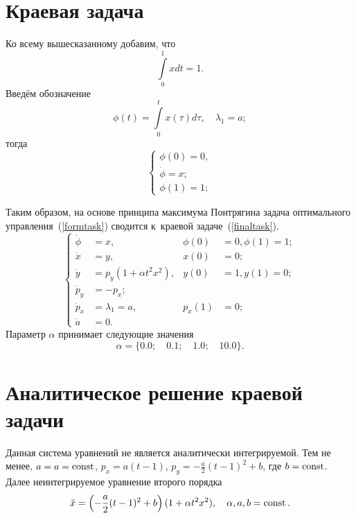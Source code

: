 \section{Краевая задача}
Ко всему вышесказанному добавим, что 
\[
\int\limits_{0}^{1} x dt = 1.
\]
Введём обозначение
\[
\phi(t) = \int\limits_{0}^{t} x(\tau) d\tau, \quad \lambda_1 = a;
\]
тогда 
\begin{equation}\label{dopeqq}
\begin{cases}
\phi(0) = 0,\\ 
\dot\phi = x;\\
\phi(1) = 1;
\end{cases}
\end{equation}

Таким образом, на основе принципа максимума Понтрягина задача оптимального управления~(\ref{formtask}) сводится к~краевой задаче~(\ref{finaltask}). 
\begin{equation}\label{finaltask}\left\{
\begin{aligned}
	\dot\phi &= x,&\phi(0)&=0,\phi(1)=1;\\
	\dot{x} &= y,&x(0)&=0; \\
	\dot{y} &= p_y (1 + \alpha t^2x^2),&y(0)&=1,y(1)=0;\\ %
	\dot{p}_y &= - p_x;\\
	\dot{p}_x &= \lambda_1 = a,&p_x(1)&=0; \\
	\dot{a} &= 0.
\end{aligned}\right.
\end{equation}
Параметр $\alpha$ принимает следующие значения
\[ \alpha = \{0.0;\quad 0.1; \quad 1.0; \quad 10.0\}.\]

\section{Аналитическое решение краевой задачи}
Данная система уравнений не является аналитически интегрируемой. Тем не менее, $a = a=\operatorname{const}$, $p_x = a(t-1)$, $p_y = -\frac a2(t-1)^2 + b$, где $b=\operatorname{const}$. Далее неинтегрируемое уравнение второго порядка
\[
  \ddot x = \left( -\frac a2(t-1)^2 + b \right)(1+\alpha t^2 x^2),\quad
  \alpha,a,b= \operatorname{const}.
\]

